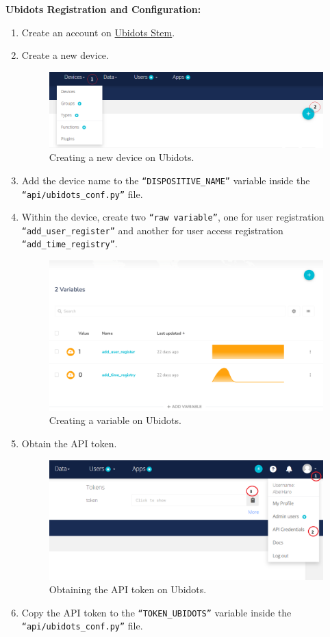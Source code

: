 \documentclass{article}
\begin{document}
\textbf{Ubidots Registration and Configuration:}
\begin{enumerate}
	\item Create an account on \href{https://stem.ubidots.com/}{Ubidots Stem}.
	\item Create a new device.
	\begin{figure}[H]
		\centering
		\includegraphics[width=0.7\linewidth]{../images/ubidots_create_device_1.png}
		\caption{\label{fig:ubidots_create_device_1}Creating a new device on Ubidots.}
	\end{figure}
	\item Add the device name to the \texttt{``DISPOSITIVE\_NAME''} variable inside the \texttt{``api/ubidots\_conf.py''} file.
	\item Within the device, create two \texttt{``raw variable''}, one for user registration \texttt{``add\_user\_register''} and another for user access registration \texttt{``add\_time\_registry''}.
	\begin{figure}[H]
		\centering
		\includegraphics[width=0.7\linewidth]{../images/ubidots_create_variable.png}
		\caption{\label{fig:ubidots_create_variable_1}Creating a variable on Ubidots.}
	\end{figure}
	\item Obtain the API token.
		\begin{figure}[H]
			\centering
			\includegraphics[width=0.7\linewidth]{../images/ubidots_obtener_token.png}
			\caption{\label{fig:ubidots_obtener_token}Obtaining the API token on Ubidots.}
		\end{figure}
	\item Copy the API token to the \texttt{``TOKEN\_UBIDOTS''} variable inside the \texttt{``api/ubidots\_conf.py''} file.
\end{enumerate}
\end{document}
